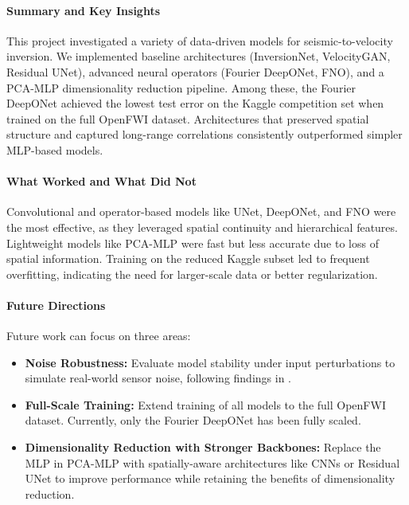 \documentclass{article}
\begin{document}
\paragraph{Summary and Key Insights}
This project investigated a variety of data-driven models for seismic-to-velocity inversion. We implemented baseline architectures (InversionNet, VelocityGAN, Residual UNet), advanced neural operators (Fourier DeepONet, FNO), and a PCA-MLP dimensionality reduction pipeline. Among these, the Fourier DeepONet achieved the lowest test error on the Kaggle competition set when trained on the full OpenFWI dataset. Architectures that preserved spatial structure and captured long-range correlations consistently outperformed simpler MLP-based models.

\paragraph{What Worked and What Did Not}
Convolutional and operator-based models like UNet, DeepONet, and FNO were the most effective, as they leveraged spatial continuity and hierarchical features. Lightweight models like PCA-MLP were fast but less accurate due to loss of spatial information. Training on the reduced Kaggle subset led to frequent overfitting, indicating the need for larger-scale data or better regularization.

\paragraph{Future Directions}
Future work can focus on three areas:
\begin{itemize}[leftmargin=*, itemsep=1pt, topsep=2pt]
    \item \textbf{Noise Robustness:} Evaluate model stability under input perturbations to simulate real-world sensor noise, following findings in \cite{fdonet}.
    \item \textbf{Full-Scale Training:} Extend training of all models to the full OpenFWI dataset. Currently, only the Fourier DeepONet has been fully scaled.
    \item \textbf{Dimensionality Reduction with Stronger Backbones:} Replace the MLP in PCA-MLP with spatially-aware architectures like CNNs or Residual UNet to improve performance while retaining the benefits of dimensionality reduction.
\end{itemize}

\end{document}

